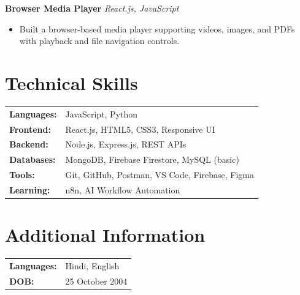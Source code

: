 \documentclass[a4paper,10pt]{article}
\begin{document}
\vspace{-2pt}

\textbf{Browser Media Player}
\hfill \textit{React.js, JavaScript}

\begin{itemize}
    \item Built a browser-based media player supporting videos, images, and PDFs with playback and file navigation controls.
\end{itemize}

\vspace{-2pt}

\section*{Technical Skills}

\begin{tabular}{@{}p{4cm}p{11cm}}

\textbf{Languages:} & JavaScript, Python \\

\textbf{Frontend:} & React.js, HTML5, CSS3, Responsive UI \\

\textbf{Backend:} & Node.js, Express.js, REST APIs \\

\textbf{Databases:} & MongoDB, Firebase Firestore, MySQL (basic) \\

\textbf{Tools:} & Git, GitHub, Postman, VS Code, Firebase, Figma \\

\textbf{Learning:} & n8n, AI Workflow Automation \\

\end{tabular}

\vspace{-2pt}

\section*{Additional Information}

\begin{tabular}{@{}p{3cm}p{10cm}}
\textbf{Languages:} & Hindi, English \\
\textbf{DOB:} & 25 October 2004 \\
\end{tabular}
\end{document}
